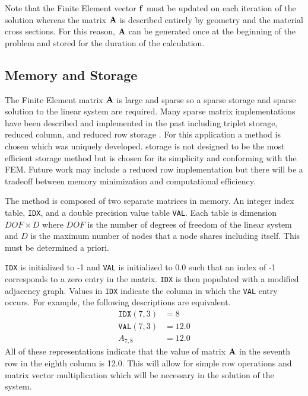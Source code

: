     Note that the Finite Element vector $\mathbf{f}$ must be updated on each iteration
    of the solution whereas the matrix $\mathbf{A}$ is described entirely by geometry 
    and the material cross sections. For this reason, $\mathbf{A}$ can be generated 
    once at the beginning of the problem and stored for the duration of the 
    calculation.
    \FloatBarrier %
  \subsection{Memory and Storage}
    The Finite Element matrix $\mathbf{A}$ is large and sparse so a sparse storage and
    sparse solution to the linear system are required. Many sparse matrix 
    implementations have been described and implemented in the past including
    triplet storage, reduced column, and reduced row storage \cite{sparseBLAS}.
    For this application a \twotable method is chosen which was uniquely 
    developed. \twotable storage is not designed to be the most efficient 
    storage method but is chosen for its simplicity and conforming with the 
    FEM. Future work may include a reduced row implementation but there will be
    a tradeoff between memory minimization and computational efficiency.
    
    The \twotable method is composed of two separate matrices in memory. An 
    integer index table, \texttt{IDX}, and a double precision value table
    \texttt{VAL}. Each table is dimension $DOF \times D$ where $DOF$ is the
    number of degrees of freedom of the linear system and $D$ is the maximum
    number of nodes that a node shares including itself. This must be determined
    a priori. 
    
    \texttt{IDX} is initialized to -1 and \texttt{VAL} is initialized 
    to 0.0 such that an index of -1 corresponds to a zero entry in the 
    matrix. \texttt{IDX} is then populated with a modified adjacency graph. 
    Values in \texttt{IDX} indicate the column in which the \texttt{VAL} entry
    occurs. For example, the following descriptions are equivalent.
    \begin{align}
      \texttt{IDX}(7,3) &= 8 \\
      \texttt{VAL}(7,3) &= 12.0 \\
      A_{7,8} &= 12.0
    \end{align}
    All of these representations indicate that the value of matrix $\mathbf{A}$ in the
    seventh row in the eighth column is 12.0. This will allow for simple row 
    operations and matrix vector multiplication which will be necessary in the 
    solution of the system.
    
